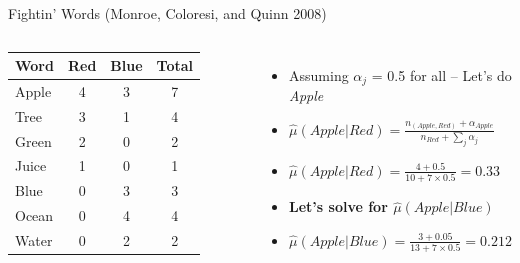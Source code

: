 \documentclass[
  ignorenonframetext,
  aspectratio=169]{beamer}
\begin{document}
\begin{frame}{Fightin' Words (Monroe, Coloresi, and Quinn 2008)}
\label{fightin-words-monroe-coloresi-and-quinn-2008-1}
\begin{columns}
\centering
\begin{tabular}{lccc}
\toprule
Word & Red & Blue & Total \\
\midrule
Apple & 4 & 3 & 7 \\
Tree  & 3 & 1 & 4 \\
Green & 2 & 0 & 2 \\
Juice & 1 & 0 & 1 \\
Blue  & 0 & 3 & 3 \\
Ocean & 0 & 4 & 4 \\
Water & 0 & 2 & 2 \\
\bottomrule
\end{tabular}
\begin{itemize}
\item Assuming $\alpha_j$ = 0.5 for all -- Let's do \textit{Apple} \par \vspace{2.5mm} \pause
\item $\hat{\mu}(Apple|Red) = \frac{n_{(Apple,Red)} + \alpha_{Apple}}{n_{Red} + \sum_j\alpha_j}$ \par \vspace{2.5mm}
\item $\hat{\mu}(Apple|Red) = \frac{4 + 0.5}{10 + 7 \times 0.5} = 0.33 $ \par \vspace{2.5mm} \pause
\item \textbf{Let's solve for $\hat{\mu}(Apple|Blue)$} \par \vspace{2.5mm} \pause
\item $\hat{\mu}(Apple|Blue) = \frac{3 + 0.05}{13 + 7 \times 0.5} = 0.212 $
\end{itemize}
\vfill
\end{columns}
\end{frame}
\end{document}
